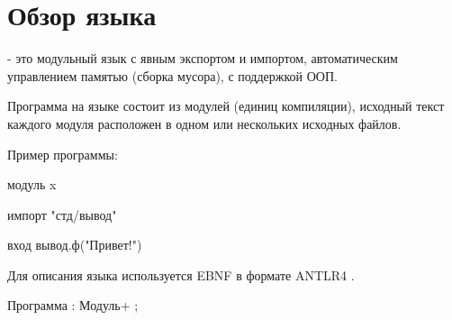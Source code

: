 \hypertarget{review}{%
\section{Обзор языка}\label{review:chapter}}

\thelang{} - это модульный язык с явным экспортом и импортом, автоматическим управлением памятью (сборка мусора), с поддержкой ООП.

Программа на языке \thelang{} состоит из модулей (единиц компиляции), исходный текст каждого модуля расположен в одном или нескольких исходных файлов.

Пример программы:
\begin{Trivil}
модуль x

импорт "стд/вывод"

вход { 
    вывод.ф("Привет!\n")
}
\end{Trivil}

Для описания языка используется EBNF в формате ANTLR4 \needlink{}.

\begin{Grammar}
Программа
    : Модуль+
    ;
\end{Grammar}
